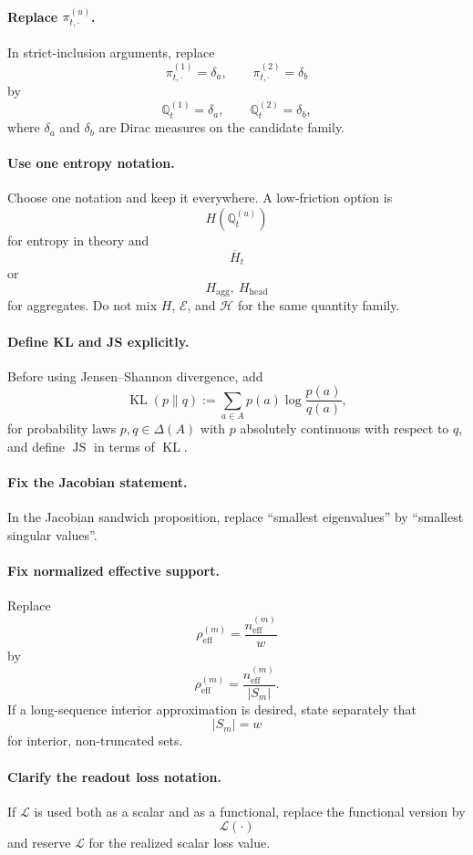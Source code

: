 \paragraph{Replace \( \pi_{t,\cdot}^{(u)} \).}
In strict-inclusion arguments, replace
\[
\pi_{t,\cdot}^{(1)}=\delta_a,
\qquad
\pi_{t,\cdot}^{(2)}=\delta_b
\]
by
\[
\mathbb Q_t^{(1)}=\delta_a,
\qquad
\mathbb Q_t^{(2)}=\delta_b,
\]
where \(\delta_a\) and \(\delta_b\) are Dirac measures on the candidate family.

\paragraph{Use one entropy notation.}
Choose one notation and keep it everywhere. A low-friction option is
\[
H(\mathbb Q_t^{(u)})
\]
for entropy in theory and
\[
\overline H_t
\]
or
\[
H_{\mathrm{agg}},\ H_{\mathrm{head}}
\]
for aggregates. Do not mix \(H\), \(\mathcal E\), and \(\mathcal H\) for the
same quantity family.

\paragraph{Define KL and JS explicitly.}
Before using Jensen--Shannon divergence, add
\[
\operatorname{KL}(p\|q)
:=
\sum_{a\in A} p(a)\log\frac{p(a)}{q(a)},
\]
for probability laws \(p,q\in\Delta(A)\) with \(p\) absolutely continuous with
respect to \(q\), and define \(\operatorname{JS}\) in terms of \(\operatorname{KL}\).

\paragraph{Fix the Jacobian statement.}
In the Jacobian sandwich proposition, replace ``smallest eigenvalues'' by
``smallest singular values''.

\paragraph{Fix normalized effective support.}
Replace
\[
\rho_{\mathrm{eff}}^{(m)}=\frac{n_{\mathrm{eff}}^{(m)}}{w}
\]
by
\[
\rho_{\mathrm{eff}}^{(m)}=\frac{n_{\mathrm{eff}}^{(m)}}{|S_m|}.
\]
If a long-sequence interior approximation is desired, state separately that
\[
|S_m|=w
\]
for interior, non-truncated sets.

\paragraph{Clarify the readout loss notation.}
If \(\mathcal L\) is used both as a scalar and as a functional, replace the
functional version by
\[
\mathscr L(\cdot)
\]
and reserve \(\mathcal L\) for the realized scalar loss value.
